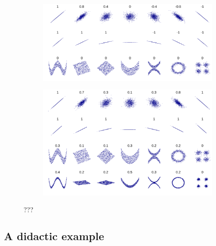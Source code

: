                 
        \begin{figure}[H]
        \centering
        \begin{subfigure}{.45\textwidth}
            \centering
            \includegraphics[width=\textwidth]{report/images/chap2_foundations/Correlation_examples2.svg.png}
            \vspace{1em}
        \end{subfigure}%
        \hspace{1em}
        \begin{subfigure}{.45\textwidth}
            \centering
            \includegraphics[width=\textwidth]{report/images/chap2_foundations/Distance_Correlation_Examples.svg.png}
        \end{subfigure}
        \caption{???}
        \label{2.5b}
        \end{figure}

        \subsection{A didactic example}

